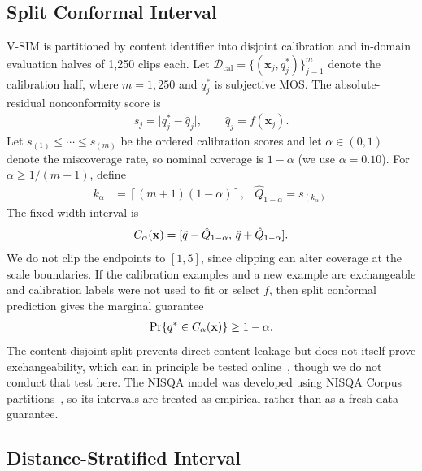 \vspace{-.2cm}
\subsection{Split Conformal Interval}
\label{ssec:conformal}

V-SIM is partitioned by content identifier into disjoint calibration and in-domain evaluation halves of 1{,}250 clips each. Let
$\mathcal{D}_{\mathrm{cal}}=\{(\mathbf{x}_j,q_j^*)\}_{j=1}^{m}$ denote the calibration half, where $m=1{,}250$ and $q_j^*$ is subjective MOS. The absolute-residual nonconformity score is
\begin{align}
    s_j = \lvert q_j^*-\hat{q}_j\rvert,
    \qquad \hat{q}_j=f(\mathbf{x}_j).
    \label{eq:nonconf}
\end{align}
Let $s_{(1)}\leq\cdots\leq s_{(m)}$ be the ordered calibration scores and let $\alpha\in(0,1)$ denote the miscoverage rate, so nominal coverage is $1-\alpha$ (we use $\alpha=0.10$). For $\alpha\geq 1/(m+1)$, define
\begin{align}
    k_\alpha
    &= \left\lceil(m+1)(1-\alpha)\right\rceil,%
    &\hat Q_{1-\alpha} = s_{(k_\alpha)}.
    \label{eq:conformal-quantile}
\end{align}
The fixed-width interval is
\begin{align}
    C_{\alpha}(\mathbf{x})
    =
    [\hat{q}-\hat Q_{1-\alpha},\,
     \hat{q}+\hat Q_{1-\alpha}].
    \label{eq:interval}
\end{align}
We do not clip the endpoints to $[1,5]$, since clipping can alter coverage at the scale boundaries. If the calibration examples and a new example are exchangeable and calibration labels were not used to fit or select $f$, then split conformal prediction gives the marginal guarantee
\begin{align}
    \Pr\!\left\{q^{*}\in C_{\alpha}(\mathbf{x})\right\}
    \geq 1-\alpha.
    \label{eq:coverage-guarantee}
\end{align}
The content-disjoint split prevents direct content leakage but does not itself prove exchangeability, which can in principle be tested online~\cite{Vovk2003mondrian}, though we do not conduct that test here. The NISQA model was developed using NISQA Corpus partitions~\cite{Mittag2021nisqa}, so its intervals are treated as empirical rather than as a fresh-data guarantee.

\vspace{-.2cm}
\subsection{Distance-Stratified Interval}
\label{ssec:adaptive}

